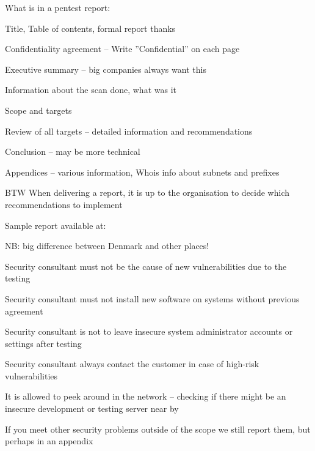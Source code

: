 \documentclass[Screen16to9,17pt]{foils}
\begin{document}

\begin{list1}
\item What is in a pentest report:
\begin{list2}
\item Title, Table of contents, formal report thanks
\item Confidentiality agreement – Write ”Confidential” on each page
\item Executive summary – big companies always want this
\item Information about the scan done, what was it
\item Scope and targets
\item Review of all targets – detailed information and recommendations
\item Conclusion – may be more technical
\item Appendices – various information, Whois info about subnets and prefixes
\end{list2}
\item BTW When delivering a report, it is up to the organisation to decide which recommendations to implement
\end{list1}

Sample report available at: 


\begin{list2}
\item NB: big difference between Denmark and other places!
\item Security consultant must not be the cause of new vulnerabilities due to the testing
\item Security consultant must not install new software on systems without previous agreement
\item Security consultant is not to leave insecure system administrator accounts or settings after testing
\item Security consultant always contact the customer in case of high-risk vulnerabilities
\item It is allowed to peek around in the network -- checking if there might be an insecure development or testing server near by
\item If you meet other security problems outside of the scope we still report them, but perhaps in an appendix
\end{list2}
\end{document}
